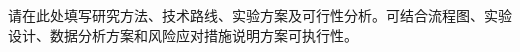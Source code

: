 \begin{GDNSFParagraphs}
请在此处填写研究方法、技术路线、实验方案及可行性分析。可结合流程图、实验设计、数据分析方案和风险应对措施说明方案可执行性。

\GDNSFBlankPara
\end{GDNSFParagraphs}
